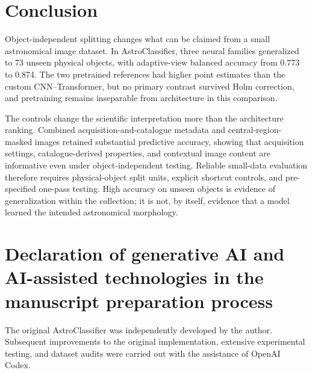 \documentclass[preprint,12pt,authoryear]{elsarticle}
\newcommand{\dataset}{AstroClassifier}
\begin{document}
\section{Conclusion}

Object-independent splitting changes what can be claimed from a small astronomical
image dataset. In \dataset{}, three neural families generalized to 73 unseen
physical objects, with adaptive-view balanced accuracy from 0.773 to 0.874. The two
pretrained references had higher point estimates than the custom CNN--Transformer,
but no primary contrast survived Holm correction, and pretraining remains inseparable
from architecture in this comparison.

The controls change the scientific interpretation more than the architecture
ranking. Combined acquisition-and-catalogue metadata and central-region-masked
images retained substantial predictive accuracy, showing that acquisition settings,
catalogue-derived properties, and contextual image content are informative even
under object-independent testing. Reliable small-data evaluation therefore requires
physical-object split units, explicit shortcut controls, and pre-specified one-pass
testing. High accuracy
on unseen objects is evidence of generalization within the collection; it is not, by
itself, evidence that a model learned the intended astronomical morphology.

\section*{Declaration of generative AI and AI-assisted technologies in the
manuscript preparation process}

The original AstroClassifier was independently developed by the author. Subsequent
improvements to the original implementation, extensive experimental testing, and
dataset audits were carried out with the assistance of OpenAI Codex.


\begingroup
\small

\endgroup
\end{document}
